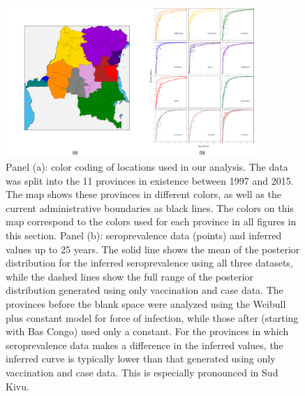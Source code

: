 \documentclass[nofootinbib,aps,pre,twocolumn,superscriptaddress,showkeys,showpacs]{revtex4-1}
\begin{document}
\begin{figure}
\includegraphics[width=0.85\textwidth,angle=0]{figures/SeroPlots-crop.pdf}
\caption{\label{fig:sero} Panel (a): color coding of locations used in our analysis. The data was split into the 11 provinces in existence between 1997 and 2015. The map shows these provinces in different colors, as well as the current administrative boundaries as black lines. The colors on this map correspond to the colors used for each province in all figures in this section. Panel (b): seroprevalence data (points) and inferred values up to 25 years. The solid line shows the mean of the posterior distribution for the inferred seroprevalence using all three datasets, while the dashed lines show the full range of the posterior distribution generated using only vaccination and case data. The provinces before the blank space were analyzed using the Weibull plus constant model for force of infection, while those after (starting with Bas Congo) used only a constant. For the provinces in which seroprevalence data makes a difference in the inferred values, the inferred curve is typically lower than that generated using only vaccination and case data. This is especially pronounced in Sud Kivu.}
\end{figure}
\end{document}
